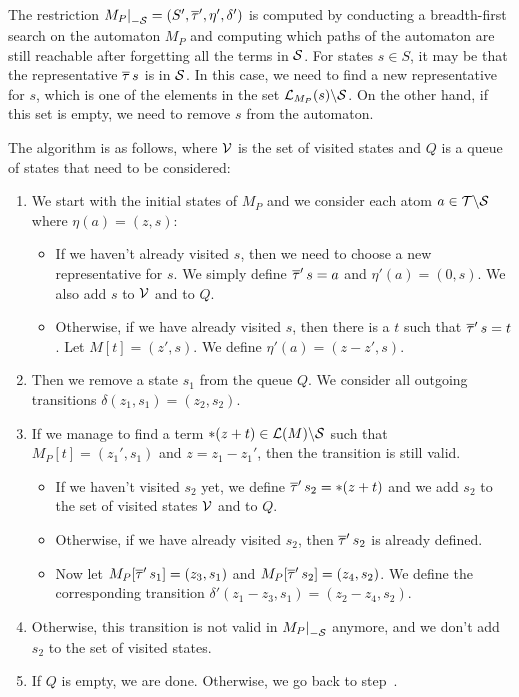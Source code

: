 The restriction $\restr{M_P}{-\Set} = (S', \otau', \eta', \delta')$ is computed by conducting a breadth-first search on the automaton $M_P$
and computing which paths of the automaton are still reachable after forgetting all the terms in $\mathcal{S}$.
For states $s \in S$, it may be that the representative $\overline{\tau}\,s$ is in $\mathcal{S}$.
In this case, we need to find a new representative for $s$, which is one of the elements in the set
$\mathcal{L}_{M_P}(s) \backslash \mathcal{S}$. On the other hand, if this set is empty,
we need to remove $s$ from the automaton.

The algorithm is as follows, where $\mathcal{V}$ is the set of visited states and $Q$ is a queue of states that need to be considered:
\begin{enumerate}
    \item We start with the initial states of $M_P$ and we consider each atom $a \in \mathcal{T} \backslash \mathcal{S}$ where $\eta(a) = (z, s)$:
          \begin{itemize}
              \item If we haven't already visited $s$, then we need to choose a new representative for $s$. We simply define $\overline{\tau}'\,s = a$ and $\eta'(a) = (0, s)$.
                    We also add $s$ to $\mathcal{V}$ and to $Q$.
              \item Otherwise, if we have already visited $s$, then there is a $t$ such that $\overline{\tau}'\,s = t$.
                    Let $M[t] = (z', s)$.
                    We define $\eta'(a) = (z - z', s)$.
          \end{itemize}
          \item\label{item:next-from-queue} Then we remove a state $s_1$ from the queue $Q$.
          We consider all outgoing transitions $\delta(z_1, s_1) = (z_2, s_2)$.
    \item If we manage to find a term $*(z+t)\in \mathcal{L}(M)\backslash \mathcal{S}$ such that $M_P[t] = (z_1', s_1)$ and $z = z_1 - z_1'$, then the transition is still valid.
          \begin{itemize}
              \item  If we haven't visited $s_2$ yet, we define $\overline{\tau}'\,s_2 = *(z+t)$ and we add $s_2$ to the set of visited states $\mathcal{V}$ and to $Q$.
              \item Otherwise, if we have already visited $s_2$, then $\overline{\tau}'\,s_2$ is already defined.
              \item Now let $M_P[\overline{\tau}'\,s_1] = (z_3, s_1)$ and $M_P[\overline{\tau}'\,s_2] = (z_4, s_2)$.
                    We define the corresponding transition $\delta'(z_1 - z_3, s_1) = (z_2 - z_4, s_2)$.
          \end{itemize}
    \item Otherwise, this transition is not valid in $\restr{M_P}{-\Set}$ anymore, and we don't add $s_2$ to the set of visited states.
    \item If $Q$ is empty, we are done. Otherwise, we go back to step~.
\end{enumerate}

